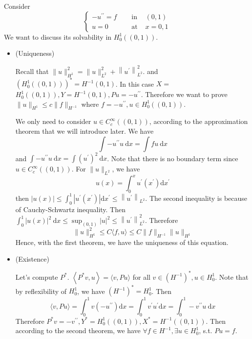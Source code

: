 \begin{example}
Consider
$$
\left\{\begin{array}{rll}
-u^{\prime \prime}=f \quad & \text { in } & (0,1) \\
u=0 & \text { at } & x=0,1
\end{array}\right.
$$
We want to discuss its solvability in $H_{0}^{1}((0,1))$.

\begin{itemize}
    \item (Uniqueness)

    Recall that $\|u\|_{H^{1}}^{2}=\|u\|_{L^{2}}^{2}+\left\|u^{\prime}\right\|_{L^{2}}^{2}$. and $\left(H_{0}^{1}((0,1))\right)^{*}=H^{-1}(0,1)$. In this case $X=$ $H_{0}^{1}((0,1)), Y=H^{-1}(0,1), P u=-u^{\prime \prime}$. Therefore we want to prove $\|u\|_{H^{1}} \leq c\|f\|_{H^{-1}}$ where $f=-u^{\prime \prime}, u \in H_{0}^{1}((0,1))$.

    We only need to consider $u \in C_{c}^{\infty}((0,1))$, according to the approximation theorem that we will introduce later. We have
$$
\int-u^{\prime \prime} u \mathrm{~d} x=\int f u \mathrm{~d} x
$$
and $\int-u^{\prime \prime} u \mathrm{~d} x=\int\left(u^{\prime}\right)^{2} \mathrm{~d} x$. Note that there is no boundary term since $u \in C_{c}^{\infty}((0,1))$. For $\|u\|_{L^{2}}$, we have
$$
u(x)=\int_{0}^{x} u^{\prime}\left(x^{\prime}\right) \mathrm{d} x^{\prime}
$$
then $|u(x)| \leq \int_{0}^{1}\left|u^{\prime}\left(x^{\prime}\right)\right| \mathrm{d} x^{\prime} \leq\left\|u^{\prime}\right\|_{L^{2}}$. The second inequality is because of Cauchy-Schwartz inequality. Then $\int_{0}^{1}|u(x)|^{2} \mathrm{~d} x \leq \sup _{(0,1)}|u|^{2} \leq\left\|u^{\prime}\right\|_{L^{2}}^{2}$. Therefore
$$
\|u\|_{H^{1}}^{2} \leq C\langle f, u\rangle \leq C\|f\|_{H^{-1}}\|u\|_{H^{1}}
$$
Hence, with the first theorem, we have the uniqueness of this equation.
    \item (Existence)

    Let's compute $P^{*}$. $\left\langle P^{*} v, u\right\rangle=\langle v, P u\rangle$ for all $v \in\left(H^{-1}\right)^{*}, u \in H_{0}^{1}$. Note that by reflexibility of $H_{0}^{1}$, we have $\left(H^{-1}\right)^{*}=H_{0}^{1}$. Then
$$
\langle v, P u\rangle=\int_{0}^{1} v\left(-u^{\prime \prime}\right) \mathrm{d} x=\int_{0}^{1} v^{\prime} u^{\prime} \mathrm{d} x=\int_{0}^{1}-v^{\prime \prime} u \mathrm{~d} x
$$
Therefore $P^{*} v=-v^{\prime \prime}, Y^{*}=H_{0}^{1}((0,1)), X^{*}=H^{-1}((0,1))$. Then according to the second theorem, we have $\forall f \in H^{-1}, \exists u \in H_{0}^{1}$, s.t. $P u=f$.
\end{itemize}
\end{example}

